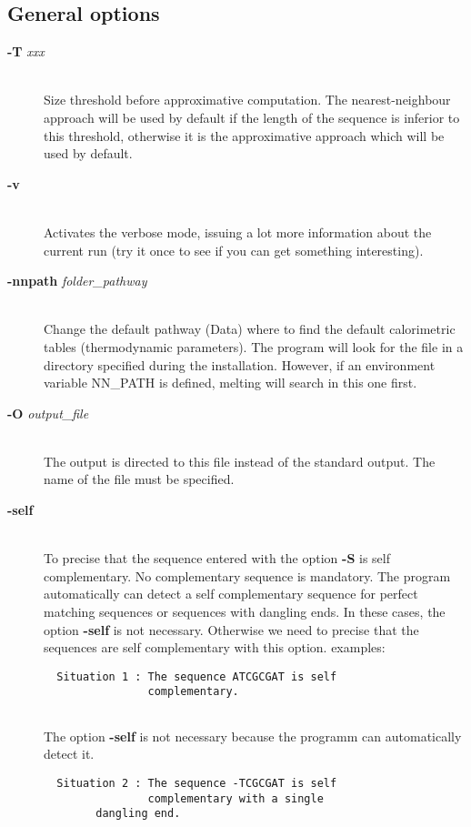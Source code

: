 \documentclass{article}
\begin{document}
\subsection{General options}
\begin{description}

\item [\textbf{-T} \textit{xxx}  ]\mbox{}\\ 
Size threshold before approximative computation. The nearest-neighbour approach 
will be used by default if the length of the sequence is inferior to this threshold,
otherwise it is the approximative approach which will be used by default.
\item [\textbf{-v}]\mbox{}\\ 
Activates the verbose mode, issuing a lot more information about the current run  (try it once 
to see if you can get something interesting).
\item [\textbf{-nnpath} \textit{folder\_pathway}]\mbox{}\\ 
  Change the default pathway (Data) where to find the default calorimetric tables (thermodynamic parameters).
  The program will look for the file in a directory specified during the installation.
  However, if an environment variable NN\_PATH is defined, melting will search in this one first.
\item [\textbf{-O} \textit{output\_file}]\mbox{}\\ 
  The output is directed to this file instead of the standard output. The name of the file must be specified.
\item [\textbf{-self}]\mbox{}\\
  To precise that the sequence entered with the option \textbf{-S} is self complementary. No complementary sequence is mandatory. 
  The program automatically can detect a self complementary sequence for perfect matching sequences or sequences with dangling ends. 
  In these cases, the option \textbf{-self} is not necessary. Otherwise we need to precise that the sequences are self complementary with this option. 
  examples: 
    
  \begin{verbatim}
  Situation 1 : The sequence ATCGCGAT is self 
                complementary. 
      
  \end{verbatim}
  
  The option \textbf{-self} is not necessary because the programm can automatically detect it.
  
  \begin{verbatim}
  Situation 2 : The sequence -TCGCGAT is self 
                complementary with a single 
		dangling end. 
      

\end{verbatim}
\end{description}
\end{document}
